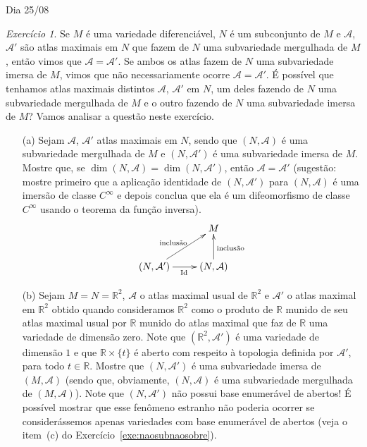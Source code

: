 \documentclass[oneside,11pt]{amsart}
\newcommand{\R}{\mathds R}
\newcommand{\Id}{\mathrm{Id}}
\DeclareMathOperator{\Dim}{dim}
\theoremstyle{remark}\newtheorem{exercise}{Exercício}[section]
\theoremstyle{plain}\newtheorem{teo}{Teorema}[section]
\theoremstyle{plain}\newtheorem{lem}[teo]{Lema}
\theoremstyle{plain}\newtheorem{prop}[teo]{Proposição}
\theoremstyle{definition}\newtheorem{defin}[teo]{Definição}
\theoremstyle{remark}\newtheorem{rem}[teo]{Observação}
\theoremstyle{definition}\newtheorem{example}[teo]{Exemplo}
\numberwithin{equation}{section}
\begin{document}
\begin{section}{Dia 25/08}
\begin{exercise}
Se $M$ é uma variedade diferenciável, $N$ é um subconjunto de $M$ e $\mathcal A$, $\mathcal A'$ são atlas maximais em $N$ que fazem de $N$
uma subvariedade mergulhada de $M$, então vimos que $\mathcal A=\mathcal A'$. Se ambos os atlas fazem de $N$ uma subvariedade imersa de $M$, vimos que não necessariamente
ocorre $\mathcal A=\mathcal A'$. É possível que tenhamos atlas maximais distintos $\mathcal A$, $\mathcal A'$ em $N$, um deles fazendo de $N$ uma subvariedade
mergulhada de $M$ e o outro fazendo de $N$ uma subvariedade imersa de $M$? Vamos analisar a questão neste exercício.
\begin{itemize}
\item[(a)] Sejam $\mathcal A$, $\mathcal A'$ atlas maximais em $N$, sendo que $(N,\mathcal A)$ é uma subvariedade mergulhada de $M$
e $(N,\mathcal A')$ é uma subvariedade imersa de $M$. Mostre que, se $\Dim(N,\mathcal A)=\Dim(N,\mathcal A')$, então $\mathcal A=\mathcal A'$ (sugestão:
mostre primeiro que a aplicação identidade de $(N,\mathcal A')$ para $(N,\mathcal A)$ é uma imersão de classe $C^\infty$ e depois conclua que ela é
um difeomorfismo de classe $C^\infty$ usando o teorema da função inversa).
\[\xymatrix{%
&M\\
(N,\mathcal A')\ar[ur]^{\text{inclusão}}\ar[r]_{\Id}&(N,\mathcal A)\ar[u]_{\text{inclusão}}}\]
\item[(b)] Sejam $M=N=\R^2$, $\mathcal A$ o atlas maximal usual de $\R^2$ e $\mathcal A'$ o atlas maximal em $\R^2$ obtido quando consideramos
$\R^2$ como o produto de $\R$ munido de seu atlas maximal usual por $\R$ munido do atlas maximal que faz de $\R$ uma variedade de dimensão zero. Note
que $(\R^2,\mathcal A')$ é uma variedade de dimensão $1$ e que $\R\times\{t\}$ é aberto com respeito à topologia definida por $\mathcal A'$, para todo
$t\in\R$. Mostre que $(N,\mathcal A')$ é uma subvariedade imersa de $(M,\mathcal A)$ (sendo que, obviamente, $(N,\mathcal A)$ é uma subvariedade
mergulhada de $(M,\mathcal A)$). Note que $(N,\mathcal A')$ não possui base enumerável de abertos! É possível mostrar que esse fenômeno estranho
não poderia ocorrer se considerássemos apenas variedades com base enumerável de abertos (veja o item~(c) do
Exercício~\ref{exe:naosubnaosobre}).
\end{itemize}
\end{exercise}


\end{section}
\end{document}
